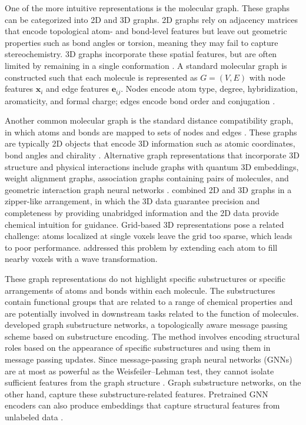 One of the more intuitive representations is the molecular graph. These graphs can be categorized into 2D and 3D graphs. 2D graphs rely on adjacency matrices that encode topological atom- and bond-level features but leave out geometric properties such as bond angles or torsion, meaning they may fail to capture stereochemistry. 3D graphs incorporate these spatial features, but are often limited by remaining in a single conformation \citep{Zhichun2023}. A standard molecular graph is constructed such that each molecule is represented as $G = (V,E)$ with node features $\mathbf{x}_i$ and edge features $\mathbf{e}_{ij}$. Nodes encode atom type, degree, hybridization, aromaticity, and formal charge; edges encode bond order and conjugation \citep{Zhichun2023}. 

Another common molecular graph is the standard distance compatibility graph, in which atoms and bonds are mapped to sets of nodes and edges \citep{David2020, Hnig2022}. These graphs are typically 2D objects that encode 3D information such as atomic coordinates, bond angles and chirality \citep{David2020}. Alternative graph representations that incorporate 3D structure and physical interactions include graphs with quantum 3D embeddings, weight alignment graphs, association graphs containing pairs of molecules, and geometric interaction graph neural networks \citep{Hnig2022, yan2023, Yang2023GIGN}. \citet{Du2022} combined 2D and 3D graphs in a zipper-like arrangement, in which the 3D data guarantee precision and completeness by providing unabridged information and the 2D data provide chemical intuition for guidance. Grid-based 3D representations pose a related challenge: atoms localized at single voxels leave the grid too sparse, which leads to poor performance. \citet{Kuzminykh2018} addressed this problem by extending each atom to fill nearby voxels with a wave transformation.
      
These graph representations do not highlight specific substructures or specific arrangements of atoms and bonds within each molecule. The substructures contain functional groups that are related to a range of chemical properties and are potentially involved in downstream tasks related to the function of molecules. \citet{Bouritsas2023} developed graph substructure networks, a topologically aware message passing scheme based on substructure encoding. The method involves encoding structural roles based on the appearance of specific substructures and using them in message passing updates. Since message-passing graph neural networks (GNNs) are at most as powerful as the Weisfeiler--Lehman test, they cannot isolate sufficient features from the graph structure \citep{Bouritsas2023}. Graph substructure networks, on the other hand, capture these substructure-related features. Pretrained GNN encoders can also produce embeddings that capture structural features from unlabeled data \citep{kishimoto2023, ross2022}. 

